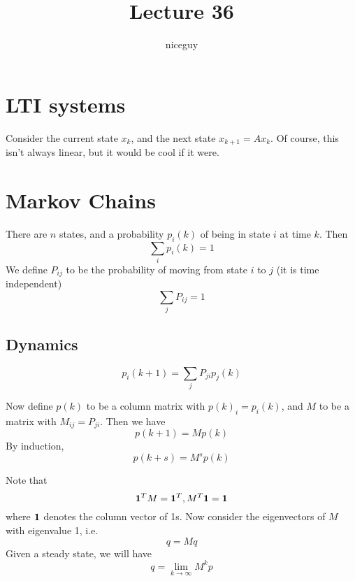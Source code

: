 \documentclass[12pt]{article}
\author{niceguy}
\title{Lecture 36}
\begin{document}
\maketitle

\section{LTI systems}

Consider the current state $x_k$, and the next state $x_{k+1} = Ax_k$. Of course, this isn't always linear, but it would be cool if it were.

\section{Markov Chains}

There are $n$ states, and a probability $p_i(k)$ of being in state $i$ at time $k$. Then
$$\sum_i p_i(k) = 1$$
We define $P_{ij}$ to be the probability of moving from state $i$ to $j$ (it is time independent)
$$\sum_j P_{ij} = 1$$

\subsection{Dynamics}

$$p_i(k+1) = \sum_j P_{ji}p_j(k)$$

Now define $p(k)$ to be a column matrix with $p(k)_i = p_i(k)$, and $M$ to be a matrix with $M_{ij} = P_{ji}$. Then we have
$$p(k+1)=Mp(k)$$
By induction,
$$p(k+s)=M^sp(k)$$

Note that
$$\textbf 1^TM = \textbf 1^T, M^T\textbf 1 = \textbf 1$$
where $\textbf 1$ denotes the column vector of 1s. Now consider the eigenvectors of $M$ with eigenvalue 1, i.e.
$$q = Mq$$
Given a steady state, we will have
$$q = \lim_{k\rightarrow\infty}M^k p$$
\end{document}
